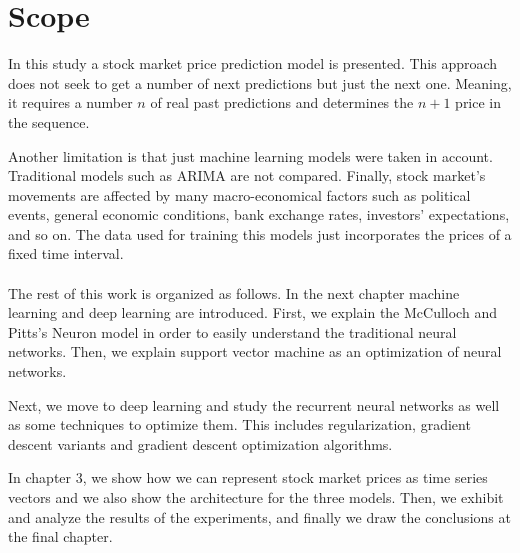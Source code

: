\section{Scope}
In this study a stock market price prediction model is presented. This approach does not seek to get a number of next predictions but just the next one. Meaning, it requires a number $n$ of real past predictions and determines the $n+1$ price in the sequence. 

Another limitation is that just machine learning models were taken in account. Traditional models such as ARIMA are not compared. Finally, stock market’s movements are affected by many macro-economical factors such as political events, general economic conditions, bank exchange rates, investors’ expectations, and so on. The data used for training this models just incorporates the prices of a fixed time interval.\\\\


The rest of this work is organized as follows. In the next chapter machine learning and deep learning are introduced. First, we explain the McCulloch and Pitts's Neuron model in order to easily understand the traditional neural networks. Then, we explain support vector machine as an optimization of neural networks.

Next, we move to deep learning and study the recurrent neural networks as well as some techniques to optimize them. This includes regularization, gradient descent variants and gradient descent optimization algorithms.  

In  chapter 3, we show how we can represent stock market prices as time series vectors and we also show the architecture for the three models. Then, we exhibit and analyze  the results of the experiments, and finally we draw the conclusions at the final chapter.

